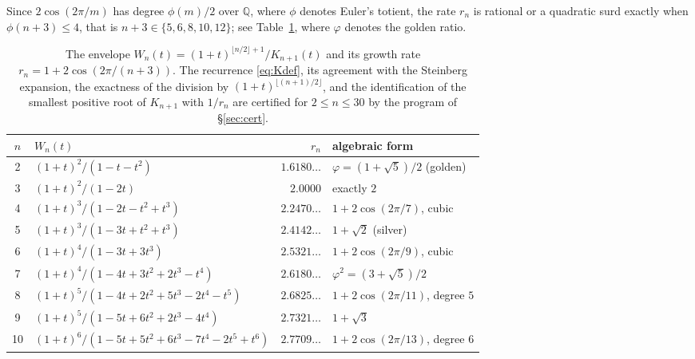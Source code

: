 \documentclass[11pt,a4paper]{article}
\newcommand{\Q}{\mathbb{Q}}
\theoremstyle{definition}
\theoremstyle{remark}
\theoremstyle{plain}
\begin{document}
Since $2\cos(2\pi/m)$ has degree $\phi(m)/2$ over $\Q$, where $\phi$ denotes Euler's totient,
the rate $r_n$ is rational or a quadratic surd exactly when $\phi(n+3)\le4$, that is
$n+3\in\{5,6,8,10,12\}$; see Table~\ref{tab:n-dim-rates}, where $\varphi$ denotes the golden
ratio.

\begin{table}[ht!]
\centering
\small
\renewcommand{\arraystretch}{1.2}
\begin{tabular}{c l r l}
\toprule
$n$ & $W_n(t)$ & $r_n$ & algebraic form \\
\midrule
2  & $(1+t)^2/(1-t-t^2)$                        & $1.6180\ldots$ & $\varphi=(1+\sqrt5)/2$ (golden) \\
3  & $(1+t)^2/(1-2t)$                           & $2.0000$       & exactly $2$ \\
4  & $(1+t)^3/(1-2t-t^2+t^3)$                   & $2.2470\ldots$ & $1+2\cos(2\pi/7)$, cubic \\
5  & $(1+t)^3/(1-3t+t^2+t^3)$                   & $2.4142\ldots$ & $1+\sqrt2$ (silver) \\
6  & $(1+t)^4/(1-3t+3t^3)$                      & $2.5321\ldots$ & $1+2\cos(2\pi/9)$, cubic \\
7  & $(1+t)^4/(1-4t+3t^2+2t^3-t^4)$             & $2.6180\ldots$ & $\varphi^2=(3+\sqrt5)/2$ \\
8  & $(1+t)^5/(1-4t+2t^2+5t^3-2t^4-t^5)$        & $2.6825\ldots$ & $1+2\cos(2\pi/11)$, degree $5$ \\
9  & $(1+t)^5/(1-5t+6t^2+2t^3-4t^4)$            & $2.7321\ldots$ & $1+\sqrt3$ \\
10 & $(1+t)^6/(1-5t+5t^2+6t^3-7t^4-2t^5+t^6)$   & $2.7709\ldots$ & $1+2\cos(2\pi/13)$, degree $6$ \\
\bottomrule
\end{tabular}
\caption{The envelope $W_n(t)=(1+t)^{\lfloor n/2\rfloor+1}/K_{n+1}(t)$ and its growth rate
$r_n=1+2\cos(2\pi/(n+3))$. The recurrence \eqref{eq:Kdef}, its agreement with the Steinberg
expansion, the exactness of the division by $(1+t)^{\lfloor(n+1)/2\rfloor}$, and the
identification of the smallest positive root of $K_{n+1}$ with $1/r_n$ are certified for
$2\le n\le30$ by the program of \S\ref{sec:cert}.}
\label{tab:n-dim-rates}
\end{table}
\end{document}

